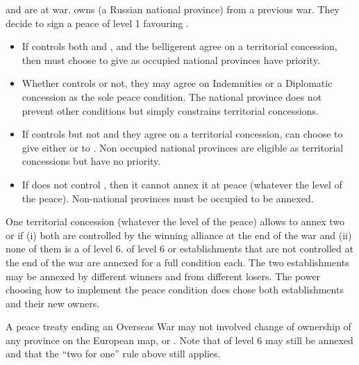 \begin{exemple}
  \SUE and \RUS are at war. \SUE owns \provinceNeva (a Russian national
  province) from a previous war. They decide to sign a peace of level 1
  favouring \RUS.
  \begin{itemize}
  \item If \RUS controls both \provinceNeva and \provinceKarelen, and the
    belligerent agree on a territorial concession, then \SUE must choose to
    give \provinceNeva as occupied national provinces have priority.
  \item Whether \RUS controls \provinceNeva or not, they may agree on
    Indemnities or a Diplomatic concession as the sole peace condition. The
    national province does not prevent other conditions but simply constrains
    territorial concessions.
  \item If \RUS controls \provinceKarelen but not \provinceNeva and they agree
    on a territorial concession, \SUE can choose to give either \provinceNeva
    or \provinceKarelen to \RUS. Non occupied national provinces are eligible
    as territorial concessions but have no priority.
  \item If \RUS does not control \provinceKarelen, then it cannot annex it at
    peace (whatever the level of the peace). Non-national provinces must be
    occupied to be annexed.
  \end{itemize}
\end{exemple}

\bparag One territorial concession (whatever the level of the peace) allows to
annex two \COL or \TP if (i) both are controlled by the winning alliance at
the end of the war and (ii) none of them is a \COL of level 6.
\bparag \COL of level 6 or establishments that are not controlled at the end
of the war are annexed for a full condition each.
\bparag The two establishments may be annexed by different winners and from
different losers.
\bparag The power choosing how to implement the peace condition does chose
both establishments and their new owners.

A peace treaty ending an Overseas War may not involved change of ownership of
any province on the European map,  or .
\bparag Note that \COL of level 6 may still be annexed and that the ``two for
one'' rule above still applies.

